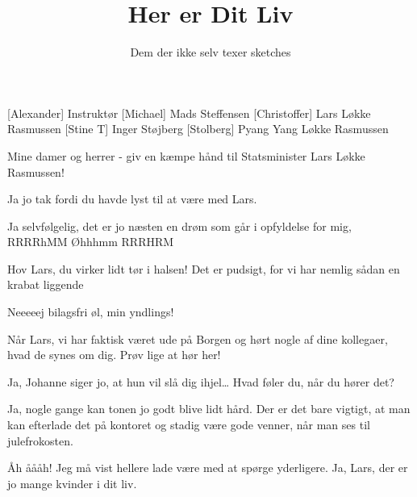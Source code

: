 \documentclass[a4paper,11pt]{article}
\title{Her er Dit Liv}
\author{Dem der ikke selv texer sketches}
\begin{document}
\maketitle

\begin{roles}
[Alexander] Instruktør
[Michael] Mads Steffensen
[Christoffer] Lars Løkke Rasmussen
[Stine T] Inger Støjberg  
[Stolberg]	Pyang Yang Løkke Rasmussen
\end{roles}

\begin{props}
\prop{}
\end{props}


\begin{sketch}



 Mine damer og herrer - giv en kæmpe hånd til Statsminister Lars Løkke Rasmussen! 


 Ja jo tak fordi du havde lyst til at være med Lars.

 Ja selvfølgelig, det er jo næsten en drøm som går i opfyldelse for mig,  RRRRhMM Øhhhmm RRRHRM

 Hov Lars, du virker lidt tør i halsen! Det er pudsigt, for vi har nemlig sådan en krabat liggende 


 Neeeeej bilagsfri øl, min yndlings!

 Når Lars, vi har faktisk været ude på Borgen og hørt nogle af dine kollegaer, hvad de synes om dig. Prøv lige at hør her!


 Ja, Johanne siger jo, at hun vil slå dig ihjel… Hvad føler du, når du hører det?

 Ja, nogle gange kan tonen jo godt blive lidt hård. Der er det bare vigtigt, at man kan efterlade det på kontoret og stadig være gode venner, når man ses til julefrokosten.

 Åh åååh! Jeg må vist hellere lade være med at spørge yderligere. Ja, Lars, der er jo mange kvinder i dit liv. 


\end{sketch}
\end{document}
